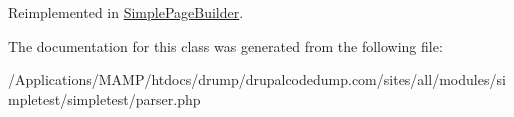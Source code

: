 Reimplemented in \hyperlink{class_simple_page_builder_a7b40a556918f88bd570eed376ad36b7e}{SimplePageBuilder}.

The documentation for this class was generated from the following file:\begin{DoxyCompactItemize}
\item 
/Applications/MAMP/htdocs/drump/drupalcodedump.com/sites/all/modules/simpletest/simpletest/parser.php\end{DoxyCompactItemize}
